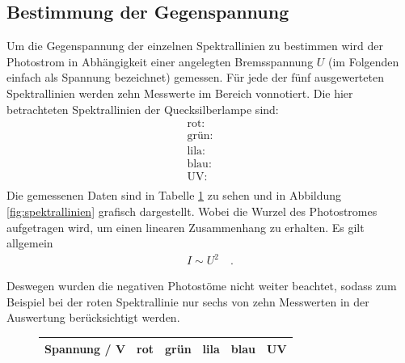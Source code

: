 \subsection{Bestimmung der Gegenspannung}
Um die Gegenspannung der einzelnen Spektrallinien zu bestimmen wird der Photostrom in Abhängigkeit einer angelegten Bremsspannung $U$ (im Folgenden einfach als Spannung bezeichnet) gemessen. Für jede der fünf ausgewerteten Spektrallinien werden zehn Messwerte im Bereich vonnotiert.
Die hier betrachteten Spektrallinien der Quecksilberlampe sind:
\begin{align*}
	\text{rot:} \quad &  \\
	\text{grün:} \quad &  \\
	\text{lila:} \quad &  \\
	\text{blau:} \quad &  \\
	\text{UV:} \quad &  \\
\end{align*}
Die gemessenen Daten sind in Tabelle \ref{tab:messdaten1}  zu sehen und in Abbildung \ref{fig:spektrallinien} grafisch dargestellt. Wobei die Wurzel des Photostromes aufgetragen wird, um einen linearen Zusammenhang zu erhalten. Es gilt allgemein
\begin{align}
	I \sim U^2 \quad .
\end{align}

Deswegen wurden die negativen Photostöme nicht weiter beachtet, sodass zum Beispiel bei der roten Spektrallinie nur sechs von zehn Messwerten in der Auswertung berücksichtigt werden. \\
\begin{figure}[h!]
	\centering
	\begin{tabular}{c|ccccc}
		Spannung / V & rot & grün & lila & blau & UV \\
		\hline
		
	\end{tabular}
	\label{tab:messdaten1}
\end{figure}

